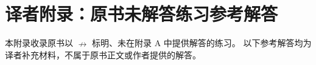\chapter{译者附录：原书未解答练习参考解答}
\label{chap:translator-solutions}

本附录收录原书以 \(\nrightarrow\) 标明、未在附录 A 中提供解答的练习。
以下参考解答均为译者补充材料，不属于原书正文或作者提供的解答。





















